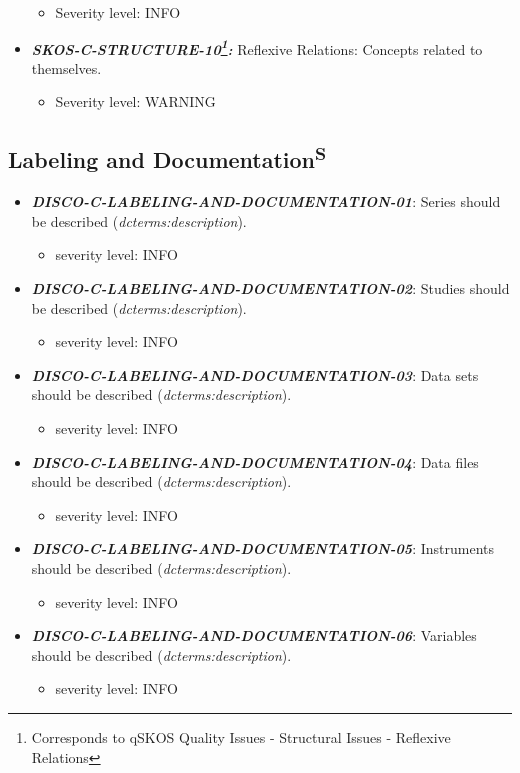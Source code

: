 \documentclass{llncs}
\begin{document}
\begin{itemize}
	\begin{itemize}
		\item Severity level: INFO
	\end{itemize}
	\item \textbf{{\em SKOS-C-STRUCTURE-10\footnote{Corresponds to qSKOS Quality Issues - Structural Issues - Reflexive Relations}:}}
	Reflexive Relations:
	Concepts related to themselves. 
	\begin{itemize}
		\item Severity level: WARNING
	\end{itemize}
\end{itemize}

\subsection{Labeling and Documentation\textsuperscript{S}}

\begin{itemize}
	\item \textbf{{\em DISCO-C-LABELING-AND-DOCUMENTATION-01}}: 
	Series should be described (\emph{dcterms:description}).
	\begin{itemize}
		\item severity level: INFO
	\end{itemize}
	\item \textbf{{\em DISCO-C-LABELING-AND-DOCUMENTATION-02}}: 
	Studies should be described (\emph{dcterms:description}).
	\begin{itemize}
		\item severity level: INFO
	\end{itemize}
	\item \textbf{{\em DISCO-C-LABELING-AND-DOCUMENTATION-03}}: 
	Data sets should be described (\emph{dcterms:description}).
	\begin{itemize}
		\item severity level: INFO
	\end{itemize}
	\item \textbf{{\em DISCO-C-LABELING-AND-DOCUMENTATION-04}}: 
	Data files should be described (\emph{dcterms:description}).
	\begin{itemize}
		\item severity level: INFO
	\end{itemize}
	\item \textbf{{\em DISCO-C-LABELING-AND-DOCUMENTATION-05}}: 
	Instruments should be described (\emph{dcterms:description}).
	\begin{itemize}
		\item severity level: INFO
	\end{itemize}
	\item \textbf{{\em DISCO-C-LABELING-AND-DOCUMENTATION-06}}: 
	Variables should be described (\emph{dcterms:description}).
	\begin{itemize}
		\item severity level: INFO
	\end{itemize}
\end{itemize}
\end{document}
